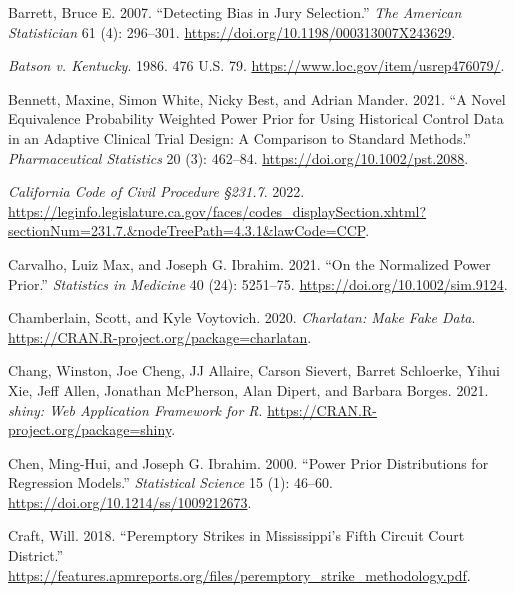 \documentclass[12pt]{article}
\newlength{\cslhangindent}
\newlength{\cslentryspacingunit} %
\newenvironment{CSLReferences}[2] %
 {%
  \setlength{\parindent}{0pt}
  \ifodd #1
  \let\oldpar\par
  \def\par{\hangindent=\cslhangindent\oldpar}
  \fi
  \setlength{\parskip}{#2\cslentryspacingunit}
 }%
 {}
\begin{document}
\hypertarget{refs}{}
\begin{CSLReferences}{1}{0}
\leavevmode{}%
Barrett, Bruce E. 2007. {``Detecting Bias in Jury Selection.''} \emph{The American Statistician} 61 (4): 296--301. \url{https://doi.org/10.1198/000313007X243629}.

\leavevmode{}%
\emph{Batson v. Kentucky}. 1986. 476 U.S. 79. \url{https://www.loc.gov/item/usrep476079/}.

\leavevmode{}%
Bennett, Maxine, Simon White, Nicky Best, and Adrian Mander. 2021. {``A Novel Equivalence Probability Weighted Power Prior for Using Historical Control Data in an Adaptive Clinical Trial Design: A Comparison to Standard Methods.''} \emph{Pharmaceutical Statistics} 20 (3): 462--84. \url{https://doi.org/10.1002/pst.2088}.

\leavevmode{}%
\emph{California Code of Civil Procedure §231.7}. 2022. \url{https://leginfo.legislature.ca.gov/faces/codes_displaySection.xhtml?sectionNum=231.7.\&nodeTreePath=4.3.1\&lawCode=CCP}.

\leavevmode{}%
Carvalho, Luiz Max, and Joseph G. Ibrahim. 2021. {``On the Normalized Power Prior.''} \emph{Statistics in Medicine} 40 (24): 5251--75. \url{https://doi.org/10.1002/sim.9124}.

\leavevmode{}%
Chamberlain, Scott, and Kyle Voytovich. 2020. \emph{Charlatan: Make Fake Data}. \url{https://CRAN.R-project.org/package=charlatan}.

\leavevmode{}%
Chang, Winston, Joe Cheng, JJ Allaire, Carson Sievert, Barret Schloerke, Yihui Xie, Jeff Allen, Jonathan McPherson, Alan Dipert, and Barbara Borges. 2021. \emph{{shiny: Web Application Framework for R}}. \url{https://CRAN.R-project.org/package=shiny}.

\leavevmode{}%
Chen, Ming-Hui, and Joseph G. Ibrahim. 2000. {``Power Prior Distributions for Regression Models.''} \emph{Statistical Science} 15 (1): 46--60. \url{https://doi.org/10.1214/ss/1009212673}.

\leavevmode{}%
Craft, Will. 2018. {``{Peremptory Strikes in Mississippi's Fifth Circuit Court District}.''} \url{https://features.apmreports.org/files/peremptory_strike_methodology.pdf}.


\end{CSLReferences}
\end{document}
